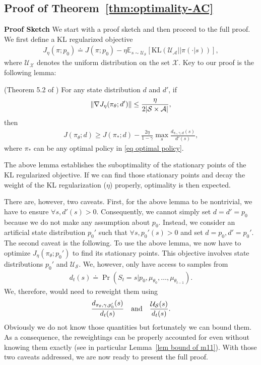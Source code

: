 \documentclass[twoside,11pt]{article}
\newcommand{\fS}{\mathcal{S}}
\newcommand{\fA}{\mathcal{A}}
\newcommand{\fU}{\mathcal{U}}
\newcommand{\E}{\mathbb{E}}
\newcommand{\nsa}{{|\fS \times \fA|}}
\newcommand{\kl}[2]{\text{KL}\left(#1||#2\right)}
\numberwithin{assucounter}{section}
\begin{document}
\subsection{Proof of Theorem~\ref{thm:optimality-AC}}
\optimalityAC*
\label{sec proof thm:optimality-AC}
\noindent \textbf{Proof Sketch} 
We start with a proof sketch and then proceed to the full proof.
We first define a KL regularized objective 
\begin{align}
  J_\eta(\pi; p_0) \doteq J(\pi; p_0) - \eta \E_{s \sim \fU_\fS} \left[\kl{\fU_\fA}{\pi(\cdot |s)}\right],
\end{align}
where $\fU_\mathcal{X}$ denotes the uniform distribution on the set $\mathcal{X}$.
Key to our proof is the following lemma:
\begin{lemma}
  (Theorem 5.2 of \citet{agarwal2019optimality})
  For any state distribution $d$ and $d'$,
  if 
  \begin{align}
    \norm{\nabla J_\eta(\pi_\theta; d')} \leq \frac{\eta}{2\nsa},
  \end{align}
  then
  \begin{align}
    J(\pi_\theta; d) \geq J(\pi_*; d) - \frac{2\eta}{1 - \gamma} \max_s {\frac{d_{\pi_*, \gamma, d}(s)}{d'(s)}},
  \end{align}
  where $\pi_*$ can be any optimal policy in \eqref{eq optimal policy}. 
\end{lemma}
The above lemma establishes the suboptimality of the stationary points of the KL regularized objective.
If we can find those stationary points and decay the weight of the KL regularization ($\eta$) properly,
optimality is then expected.

There are, however, two caveats.
First, for the above lemma to be nontrivial,
we have to ensure $\forall s, d'(s) > 0$. 
Consequently, 
we cannot simply set $d=d'=p_0$ because we do not make any assumption about $p_0$.
Instead, we consider an artificial state distribution $p_0'$ such that $\forall s, p_0'(s) > 0$ and set $d=p_0, d'=p_0'$.
The second caveat is the following.
To use the above lemma,
we now have to optimize $J_\eta(\pi_\theta; p_0')$ to find its stationary points.
This objective involves state distributions $p_0'$ and $\fU_\fS$.
We, however, only have access to samples from 
\begin{align}
  d_t(s) \doteq \Pr(S_t = s | p_0, \mu_{\theta_0}, \dots, \mu_{\theta_{t-1}}).
\end{align}
We, therefore, would need to reweight them using 
\begin{align}
  \frac{d_{\pi_{\theta}, \gamma, p_0'}(s)}{d_t(s)} \qq{and} \frac{\fU_\fS(s)}{d_t(s)}.
\end{align}
Obviously we do not know those quantities but fortunately we can bound them.
As a consequence,
the reweightings can be properly accounted for even without knowing them exactly (see in particular Lemma~\ref{lem bound of m11}).
With those two caveats addressed,
we are now ready to present the full proof.
\end{document}
